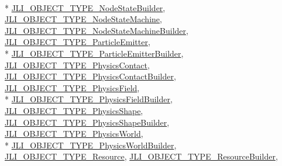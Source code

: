 \begin{DoxyCompactItemize}
\\*
\hyperlink{namespacejli_a11168ac254095f4ba73667ab33713b4fafb2f29fe89ceae02706926076401e5ff}{J\+L\+I\+\_\+\+O\+B\+J\+E\+C\+T\+\_\+\+T\+Y\+P\+E\+\_\+\+Node\+State\+Builder}, 
\hyperlink{namespacejli_a11168ac254095f4ba73667ab33713b4fa0c9ae614eee253fb1c258abeba0abb19}{J\+L\+I\+\_\+\+O\+B\+J\+E\+C\+T\+\_\+\+T\+Y\+P\+E\+\_\+\+Node\+State\+Machine}, 
\hyperlink{namespacejli_a11168ac254095f4ba73667ab33713b4fa3ff1ed55ac7bb4f4a99679ce1fce14a7}{J\+L\+I\+\_\+\+O\+B\+J\+E\+C\+T\+\_\+\+T\+Y\+P\+E\+\_\+\+Node\+State\+Machine\+Builder}, 
\hyperlink{namespacejli_a11168ac254095f4ba73667ab33713b4fab1b48f3c21a43d9fe2e3bbcb6515b059}{J\+L\+I\+\_\+\+O\+B\+J\+E\+C\+T\+\_\+\+T\+Y\+P\+E\+\_\+\+Particle\+Emitter}, 
\\*
\hyperlink{namespacejli_a11168ac254095f4ba73667ab33713b4facad92c58f5440e8cf31f05ba9ce3bb78}{J\+L\+I\+\_\+\+O\+B\+J\+E\+C\+T\+\_\+\+T\+Y\+P\+E\+\_\+\+Particle\+Emitter\+Builder}, 
\hyperlink{namespacejli_a11168ac254095f4ba73667ab33713b4fa15cae65abb2827515504c48b94685aaa}{J\+L\+I\+\_\+\+O\+B\+J\+E\+C\+T\+\_\+\+T\+Y\+P\+E\+\_\+\+Physics\+Contact}, 
\hyperlink{namespacejli_a11168ac254095f4ba73667ab33713b4fa56ea0dbaab9c999e0ef6d028223d5739}{J\+L\+I\+\_\+\+O\+B\+J\+E\+C\+T\+\_\+\+T\+Y\+P\+E\+\_\+\+Physics\+Contact\+Builder}, 
\hyperlink{namespacejli_a11168ac254095f4ba73667ab33713b4fa50c6ebf8c7c234ccb939729141e88f62}{J\+L\+I\+\_\+\+O\+B\+J\+E\+C\+T\+\_\+\+T\+Y\+P\+E\+\_\+\+Physics\+Field}, 
\\*
\hyperlink{namespacejli_a11168ac254095f4ba73667ab33713b4fa3e2efbeef070d670dfff0f5d37cdb298}{J\+L\+I\+\_\+\+O\+B\+J\+E\+C\+T\+\_\+\+T\+Y\+P\+E\+\_\+\+Physics\+Field\+Builder}, 
\hyperlink{namespacejli_a11168ac254095f4ba73667ab33713b4fac082f64545107452af9853ba7e19d5c4}{J\+L\+I\+\_\+\+O\+B\+J\+E\+C\+T\+\_\+\+T\+Y\+P\+E\+\_\+\+Physics\+Shape}, 
\hyperlink{namespacejli_a11168ac254095f4ba73667ab33713b4fa0c10cc7af6eea2138dd84d1da4695ed2}{J\+L\+I\+\_\+\+O\+B\+J\+E\+C\+T\+\_\+\+T\+Y\+P\+E\+\_\+\+Physics\+Shape\+Builder}, 
\hyperlink{namespacejli_a11168ac254095f4ba73667ab33713b4fac8ae5ac026d13828082da80a9b530e8b}{J\+L\+I\+\_\+\+O\+B\+J\+E\+C\+T\+\_\+\+T\+Y\+P\+E\+\_\+\+Physics\+World}, 
\\*
\hyperlink{namespacejli_a11168ac254095f4ba73667ab33713b4fad66acbd298aef9c201be72c6f8851452}{J\+L\+I\+\_\+\+O\+B\+J\+E\+C\+T\+\_\+\+T\+Y\+P\+E\+\_\+\+Physics\+World\+Builder}, 
\hyperlink{namespacejli_a11168ac254095f4ba73667ab33713b4faf241f6c763603fc08118143a1dad3eb0}{J\+L\+I\+\_\+\+O\+B\+J\+E\+C\+T\+\_\+\+T\+Y\+P\+E\+\_\+\+Resource}, 
\hyperlink{namespacejli_a11168ac254095f4ba73667ab33713b4fa028bf9a736b34ef0911c0d529530b46e}{J\+L\+I\+\_\+\+O\+B\+J\+E\+C\+T\+\_\+\+T\+Y\+P\+E\+\_\+\+Resource\+Builder}, 

\end{DoxyCompactItemize}
